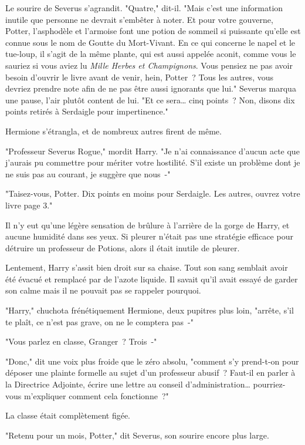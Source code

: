 Le sourire de Severus s'agrandit. "Quatre," dit-il. "Mais c'est une information inutile que personne ne devrait s'embêter à noter. Et pour votre gouverne, Potter, l'asphodèle et l'armoise font une potion de sommeil si puissante qu'elle est connue sous le nom de Goutte du Mort-Vivant. En ce qui concerne le napel et le tue-loup, il s'agit de la même plante, qui est aussi appelée aconit, comme vous le sauriez si vous aviez lu \emph{Mille Herbes et Champignons}. Vous pensiez ne pas avoir besoin d'ouvrir le livre avant de venir, hein, Potter~? Tous les autres, vous devriez prendre note afin de ne pas être aussi ignorants que lui." Severus marqua une pause, l'air plutôt content de lui. "Et ce sera… cinq points~? Non, disons dix points retirés à Serdaigle pour impertinence."

Hermione s'étrangla, et de nombreux autres firent de même.

"Professeur Severus Rogue," mordit Harry. "Je n'ai connaissance d'aucun acte que j'aurais pu commettre pour mériter votre hostilité. S'il existe un problème dont je ne suis pas au courant, je suggère que nous~-"

"Taisez-vous, Potter. Dix points en moins pour Serdaigle. Les autres, ouvrez votre livre page 3."

Il n'y eut qu'une légère sensation de brûlure à l'arrière de la gorge de Harry, et aucune humidité dans ses yeux. Si pleurer n'était pas une stratégie efficace pour détruire un professeur de Potions, alors il était inutile de pleurer.

Lentement, Harry s'assit bien droit sur sa chaise. Tout son sang semblait avoir été évacué et remplacé par de l'azote liquide. Il savait qu'il avait essayé de garder son calme mais il ne pouvait pas se rappeler pourquoi.

"Harry," chuchota frénétiquement Hermione, deux pupitres plus loin, "arrête, s'il te plaît, ce n'est pas grave, on ne le comptera pas~-"

"Vous parlez en classe, Granger~? Trois~-"

"Donc," dit une voix plus froide que le zéro absolu, "comment s'y prend-t-on pour déposer une plainte formelle au sujet d'un professeur abusif~? Faut-il en parler à la Directrice Adjointe, écrire une lettre au conseil d'administration… pourriez-vous m'expliquer comment cela fonctionne~?"

La classe était complètement figée.

"Retenu pour un mois, Potter," dit Severus, son sourire encore plus large.

